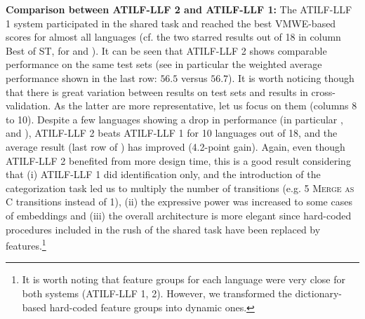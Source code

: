 \documentclass[output=paper,modfonts]{langscibook}
\begin{document}
\textbf{Comparison between ATILF-LLF 2 and ATILF-LLF 1:}
The ATILF-LLF 1 system participated in the shared task and reached the best VMWE-based scores for almost all languages (cf. the two starred results out of 18 in column Best of ST, for  and ). It can be seen that ATILF-LLF 2 shows comparable performance on the same test sets (see in particular the weighted average performance shown in the last row: $56.5$ versus $56.7$). It is worth noticing though that there is great variation between results on test sets and results in cross-validation. As the latter are more representative, let us focus on them (columns 8 to 10). Despite a few languages showing a drop in performance (in particular ,  and ), ATILF-LLF 2 beats ATILF-LLF 1  for 10 languages out of 18, and the average result (last row of ) has improved (4.2-point gain). Again, even though ATILF-LLF 2 benefited from more design time, this is a good result considering that (i) ATILF-LLF 1 did identification only, and the introduction of the categorization task led us to multiply the number of transitions (e.g. 5 \textsc{Merge as C} transitions instead of 1), (ii) the expressive power was increased to some cases of embeddings and (iii) the overall architecture is more elegant since hard-coded procedures included in the rush of the shared task have been replaced by features.\footnote{It is worth noting that feature groups for each language were very close for both systems (ATILF-LLF 1, 2). However, we transformed the dictionary-based hard-coded feature groups into dynamic ones.}
\end{document}

